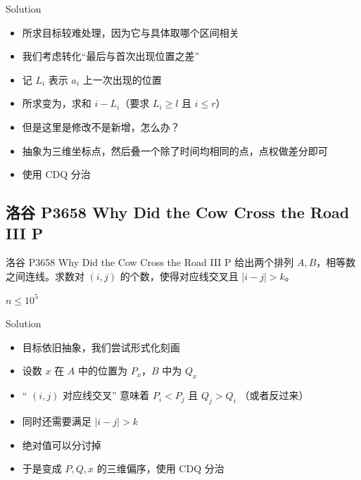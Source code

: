 ﻿\documentclass[aspectratio=169,handout]{ctexbeamer}
\begin{document}
\begin{frame}{Solution}
    \begin{itemize}
        \item 所求目标较难处理，因为它与具体取哪个区间相关
        \item 我们考虑转化“最后与首次出现位置之差”
        \item 记 $L_i$ 表示 $a_i$ 上一次出现的位置
        \item 所求变为，求和 $i-L_i$（要求 $L_i\ge l$ 且 $i\le r$）
        \item 但是这里是修改不是新增，怎么办？
        \item 抽象为三维坐标点，然后叠一个除了时间均相同的点，点权做差分即可
        \item 使用 CDQ 分治
    \end{itemize}
\end{frame}










\subsection{洛谷 P3658 Why Did the Cow Cross the Road III P}
\begin{frame}{洛谷 P3658 Why Did the Cow Cross the Road III P}
    给出两个排列 $A,B$，相等数之间连线。求数对 $(i,j)$ 的个数，使得对应线交叉且 $|i-j|>k$。
    
    $n\le 10^5$
\end{frame}

\begin{frame}{Solution}
    \begin{itemize}
        \item 目标依旧抽象，我们尝试形式化刻画
        \item 设数 $x$ 在 $A$ 中的位置为 $P_x$，$B$ 中为 $Q_x$
        \item “ $(i,j)$ 对应线交叉” 意味着 $P_i<P_j$ 且 $Q_j>Q_i$ （或者反过来）
        \item 同时还需要满足 $|i-j|>k$ 
        \item 绝对值可以分讨掉
        \item 于是变成 $P,Q,x$ 的三维偏序，使用 CDQ 分治
    \end{itemize}
\end{frame}
\end{document}
